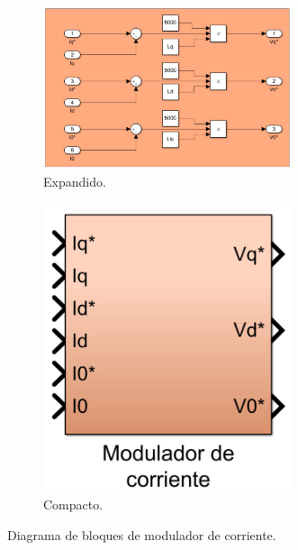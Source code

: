 \documentclass{article}
\begin{document}
\begin{figure}[H]
    \begin{subfigure}[b]{0.75\textwidth}
        \centering
        \includegraphics[width=0.8\textwidth]{modulador_de_corriente_extendido.png}
        \caption{Expandido.}
    \end{subfigure}
    \begin{subfigure}[b]{0.24\textwidth}
        \centering
        \includegraphics[width=0.8\textwidth]{modulador_de_corriente.png}
        \caption{Compacto.}
    \end{subfigure}
    \caption{Diagrama de bloques de modulador de corriente.}
\end{figure}

\end{document}
